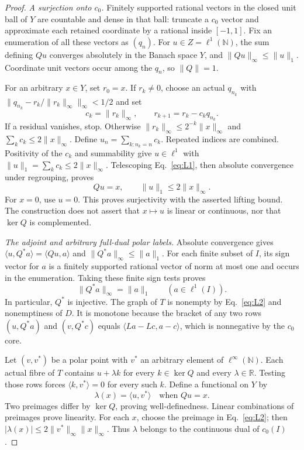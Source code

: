 \documentclass[11pt]{article}
\newcommand{\R}{\mathbb R}
\newcommand{\N}{\mathbb N}
\newcommand{\pair}[2]{\langle #1,#2\rangle}
\begin{document}
\begin{proof}
\noindent\textit{A surjection onto $c_0$.}
\label{sec:L1}
Finitely supported rational vectors in the closed unit ball of $Y$ are
countable and dense in that ball: truncate a $c_0$ vector and approximate
each retained coordinate by a rational inside $[-1,1]$. Fix an enumeration
of all these vectors as $(q_n)$. For $u\in Z=\ell^1(\N)$, the sum defining
$Qu$ converges absolutely in the Banach space $Y$, and
$\|Qu\|_\infty\le\|u\|_1$. Coordinate unit vectors occur among the $q_n$,
so $\|Q\|=1$.

For an arbitrary $x\in Y$, set $r_0=x$. If $r_k\ne0$, choose an actual
$q_{n_k}$ with $\|q_{n_k}-r_k/\|r_k\|_\infty\|_\infty<1/2$ and set
\begin{equation}
c_k=\|r_k\|_\infty,\qquad r_{k+1}=r_k-c_kq_{n_k}.
\tag{L1}\label{eq:L1}
\end{equation}
If a residual vanishes, stop. Otherwise
$\|r_k\|_\infty\le2^{-k}\|x\|_\infty$ and $\sum_k c_k\le2\|x\|_\infty$.
Define $u_n=\sum_{k:n_k=n}c_k$. Repeated indices are combined.
Positivity of the $c_k$ and summability give $u\in\ell^1$ with
$\|u\|_1=\sum_k c_k\le2\|x\|_\infty$.
Telescoping Eq.~\eqref{eq:L1}, then absolute convergence under regrouping,
proves
\begin{equation}
Qu=x,\qquad \|u\|_1\le2\|x\|_\infty.
\tag{L2}\label{eq:L2}
\end{equation}
For $x=0$, use $u=0$. This proves surjectivity with the asserted lifting
bound. The construction does not assert that $x\mapsto u$ is linear or
continuous, nor that $\ker Q$ is complemented.

\noindent\textit{The adjoint and arbitrary full-dual polar labels.}
\label{sec:L2}
Absolute convergence gives $\pair{u}{Q^*a}=\pair{Qu}{a}$ and
$\|Q^*a\|_\infty\le\|a\|_1$. For each finite subset of $I$, its sign
vector for $a$ is a finitely supported rational vector of norm at most
one and occurs in the enumeration. Taking these finite sign tests proves
\begin{equation}
\|Q^*a\|_\infty=\|a\|_1\qquad(a\in\ell^1(I)).
\tag{L3}\label{eq:L3}
\end{equation}
In particular, $Q^*$ is injective. The graph of $T$ is nonempty by
Eq.~\eqref{eq:L2} and nonemptiness of $D$. It is monotone because the
bracket of any two rows $(u,Q^*a)$ and $(v,Q^*c)$ equals
$\pair{La-Lc}{a-c}$, which is nonnegative by the $c_0$ core.

Let $(v,v^*)$ be a polar point with $v^*$ an arbitrary element of
$\ell^\infty(\N)$. Each actual fibre of $T$ contains $u+\lambda k$ for
every $k\in\ker Q$ and every $\lambda\in\R$. Testing those rows forces
$\pair{k}{v^*}=0$ for every such $k$. Define a functional on $Y$ by
\begin{equation}
\lambda(x)=\pair{u}{v^*}\quad\text{when }Qu=x.
\tag{L4}\label{eq:L4}
\end{equation}
Two preimages differ by $\ker Q$, proving well-definedness. Linear
combinations of preimages prove linearity. For each $x$, choose the
preimage in Eq.~\eqref{eq:L2}; then
$|\lambda(x)|\le2\|v^*\|_\infty\|x\|_\infty$. Thus $\lambda$ belongs to
the continuous dual of $c_0(I)$.


\end{proof}
\end{document}
